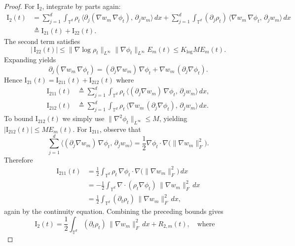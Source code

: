\documentclass[11pt]{article}
\begin{document}
\begin{proof}
    For $\text{I}_2$, integrate by parts again:
    \begin{align*}
    \text{I}_2(t)
    &=
    \sum_{j=1}^d
    \int_{\mathbb T^d}
    \rho_t \,\big\langle \partial_j(\nabla w_m\,\nabla\phi_t),\,\partial_j w_m\big\rangle\,dx
    +
    \sum_{j=1}^d
    \int_{\mathbb T^d}
    (\partial_j\rho_t)\,\big\langle \nabla w_m\,\nabla\phi_t,\,\partial_j w_m\big\rangle\,dx\\
    &\triangleq  \text{I}_{21}(t)+\text{I}_{22}(t).
    \end{align*}
    The second term satisfies
    \[
    |\,\text{I}_{22}(t)|
    \le \|\nabla\log\rho_t\|_{L^\infty}\|\nabla\phi_t\|_{L^\infty} E_m(t)
    \le K_{\log} M E_m(t).
    \]
    Expanding yields
    \[
    \partial_j(\nabla w_m\,\nabla\phi_t)
    =
    (\partial_j\nabla w_m)\,\nabla\phi_t
    +
    \nabla w_m\,(\partial_j\nabla\phi_t).
    \]
    Hence $\text{I}_{21}(t)=\text{I}_{211}(t)+\text{I}_{212}(t)$ where
    \begin{align*}
        \text{I}_{211}(t)
        &\triangleq
        \sum_{j=1}^d
        \int_{\mathbb T^d}
        \rho_t \,\big\langle (\partial_j\nabla w_m)\,\nabla\phi_t,\,\partial_j w_m\big\rangle\,dx, \\
        \text{I}_{212}(t)
        &\triangleq
        \sum_{j=1}^d
        \int_{\mathbb T^d}
        \rho_t \,\big\langle \nabla w_m\,(\partial_j\nabla\phi_t),\,\partial_j w_m\big\rangle\,dx.
    \end{align*}
    To bound $\text{I}_{212}(t)$ we simply use $\|\nabla^2\phi_t\|_{L^\infty}\le M$, yielding $|\text{I}_{212}(t)|\le M E_m(t).$ For $\text{I}_{211}$, observe that
    \[
    \sum_{j=1}^d \big\langle (\partial_j\nabla w_m)\,\nabla\phi_t,\,\partial_j w_m\big\rangle
    =
    \frac12 \nabla\phi_t\cdot \nabla\bigl(\|\nabla w_m\|_F^2\bigr).
    \]
    Therefore
    \begin{align*}
    \text{I}_{211}(t)
    &=
    \frac12\int_{\mathbb T^d}\rho_t\,\nabla\phi_t\cdot\nabla\bigl(\|\nabla w_m\|_F^2\bigr)\,dx\\
    &=
    -\frac12\int_{\mathbb T^d}\nabla\cdot(\rho_t\nabla\phi_t)\,\|\nabla w_m\|_F^2\,dx\\
    &=
    \frac12\int_{\mathbb T^d}(\partial_t\rho_t)\,\|\nabla w_m\|_F^2\,dx,
    \end{align*}
    again by the continuity equation. Combining the preceding bounds gives
    \[
    \text{I}_2(t)
    =
    \frac12\int_{\mathbb T^d}(\partial_t\rho_t)\,\|\nabla w_m\|_F^2\,dx
    +
    R_{2,m}(t),
    \quad \text{where} \quad 
\]
\end{proof}
\end{document}
